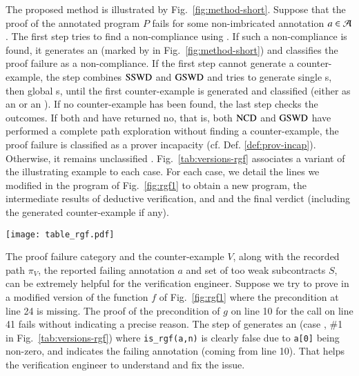 The proposed method is illustrated by Fig.~\ref{fig:method-short}.
Suppose that the proof of the annotated program $P$ fails for some non-imbricated annotation $a\in{\ensuremath\mathcal{A}}$.
The first step tries to find a non-compliance using \NCD. 
If such a non-compliance is found, it generates an \NCCE (marked by 
in Fig.~\ref{fig:method-short})
and classifies the proof failure as a non-compliance.
If the first step cannot generate a counter-example,
the \SWD step combines $\mathrm{SSWD}$ and $\mathrm{GSWD}$ 
and tries to generate single \SWCE{}s, then global \SWCE{}s, 
until the first counter-example is generated and classified 
(either as an \NCCE {} or an \SWCE {}).
If no counter-example has been found, the last step checks the outcomes.
If both \NCD and \SWD have returned \textsf{no}, that is, 
both  $\mathrm{NCD}$  and $\mathrm{GSWD}$ have performed a complete path exploration 
without finding a counter-example,
the proof failure is classified as a prover incapacity  (cf. Def. \ref{def:prov-incap}).
Otherwise, it  remains unclassified .
Fig.~\ref{tab:versions-rgf} associates a variant of the illustrating example to
each case.
For each case, we detail the lines we modified in the program of
Fig.~\ref{fig:rgf1} to obtain a new program, the intermediate results of
deductive verification, \NCD and \SWD and the final verdict (including the
generated counter-example if any).


\begin{figure*}[bt]\centering
  \texttt{[image: table\_rgf.pdf]}
  \caption{Method results for different versions of the illustrating example.}
  \label{tab:versions-rgf}
\end{figure*}


The proof failure category and the counter-example $V$, along with  
the recorded path $\pi_V$,
the reported failing annotation $a$ and set of too weak subcontracts $S$,
can be extremely helpful for the verification engineer.
Suppose we try to prove in \Wp a modified version of the function $f$ of
Fig.~\ref{fig:rgf1}
where the precondition at line 24 is missing.
The proof of the precondition of $g$ on line 10 for the call on line 41
fails without indicating a precise reason.
The \NCD step of \stady  generates an \NCCE (case ,
\#1 in Fig.~\ref{tab:versions-rgf}) where \lstinline'is_rgf(a,n)'
is clearly false due to \lstinline'a[0]' being non-zero, and indicates the
failing annotation (coming from line 10).  
That helps the verification engineer to understand and fix the issue. 


